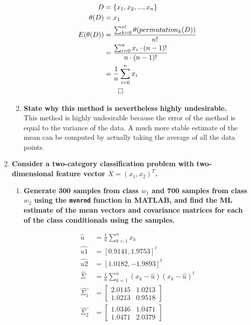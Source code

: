 \documentclass[12pt]{article}
\begin{document}
\begin{enumerate}
\begin{enumerate}
    \begin{equation}
    \begin{split}
      D& = \{x_1,x_2,...,x_n\} \\
      \theta(D)& = x_1 \\
      E(\theta(D))& = \frac{\sum_{k=0}^{n!} \theta(permutation_k(D))}{n!} \\
      & = \frac{\sum_{i=0}^{n} x_i \cdot (n-1)!}{n \cdot (n-1)!} \\
      & = \frac{1}{n}\sum_{i=0}^{n} x_i \\
      & \qed
    \end{split}
    \end{equation}
  \item \textbf{State why this method is nevertheless highly undesirable.} \\
  This method is highly undesirable because the error of the method is equal to the variance of the data. A much more stable estimate of the mean can be computed by actually taking the average of all the data points.
  \end{enumerate}
\item \textbf{Consider a two-category classiﬁcation problem with two-dimensional feature vector $X=(x_1,x_2)^T$.}
  \begin{enumerate}
  \item \textbf{Generate 300 samples from class $w_1$ and 700 samples from class $w_2$ using the \texttt{mvnrnd} function in MATLAB, and find the ML estimate of the mean vectors and covariance matrices for each of the class conditionals using the samples.}
    \begin{figure}[H]
    \begin{equation}
    \begin{split}
      \hat{u}& = \frac{1}{n}\sum_{k=1}^nx_k \\
      \hat{u1}& = [0.9141, 1.9753]^t \\
      \hat{u2}& = [1.0182, -1.9893]^t \\
      \hat{\Sigma}& = \frac{1}{n}\sum_{k=1}^n (x_k-\hat{u})(x_k-\hat{u})^t \\
      \hat{\Sigma_1}& = \left[\begin{array}{cc}2.0145 & 1.0213 \\ 1.0213 & 0.9518\end{array}\right] \\
      \hat{\Sigma_2}& = \left[\begin{array}{cc}1.0346 & 1.0471 \\ 1.0471 & 2.0379\end{array}\right] \\

\end{split}
\end{equation}
\end{figure}
\end{enumerate}
\end{enumerate}
\end{document}
